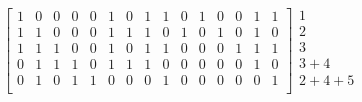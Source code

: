 \documentclass[10pt]{article}
\begin{document}
\begin{equation}
	\left[
	\begin{array}{ccccccccccccccc}
		1&0&0&0&0&1&0&1&1&0&1&0&0&1&1\\
		1&1&0&0&0&1&1&1&0&1&0&1&0&1&0\\
		1&1&1&0&0&1&0&1&1&0&0&0&1&1&1\\
		0&1&1&1&0&1&1&1&0&0&0&0&0&1&0\\
		0&1&0&1&1&0&0&0&1&0&0&0&0&0&1\\
	\end{array}
	\right]
	\begin{array}{l}
		1 \\
		2 \\
		3 \\
		3 + 4 \\
		2 + 4 + 5 \\
	\end{array}
\end{equation}
\end{document}
